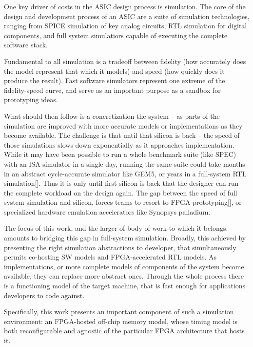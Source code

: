 One key driver of costs in the ASIC design process is simulation. The core of
the design and development process of an ASIC are a suite of simulation
technologies, ranging from SPICE simulation of key analog circuits, RTL
simulation for digital components, and full system simulatiors capable of
executing the complete software stack.

Fundamental to all simulation is a tradeoff between fidelity (how accurately
does the model represent that which it models) and speed (how quickly does it
produce the result). Fast software simulators represent one extreme of the
fidelity-speed curve, and serve as an important purpose as a sandbox for
prototyping ideas.

What should then follow is a concretization the system -- as parts of the
simulation are improved with more accurate models or implementations as they
become available. The challenge is that until that silicon is back -- the speed
of those simulations slows down exponentially as it approaches implementation.
While it may have been possible to run a whole benchmark suite (like SPEC) with
an ISA simulator in a single day, running the same suite could take months in
an abstract cycle-accurate simulator like GEM5, or years in a full-system RTL
simulation[]. Thus it is only until first silicon is back that the designer can
run the complete workload on the design again. The gap between the speed of
full system simulation and silicon, forces teams to resort to FPGA
prototyping[], or specialized hardware emulation accelerators like Synopsys
palladium\cite{palladium}.

The focus of this work, and the larger of body of work to which it belongs.
amounts to bridging this gap in full-system simulation. Broadly, this achieved
by presenting the right simulation abstractions to developer, that
simultaneously permits co-hosting SW models and FPGA-accelerated RTL models. As
implementations, or more complete models of components of the system become
available, they can replace more abstract ones. Through the whole process there
is a functioning model of the target machine, that is fast enough for
applications developers to code against.

Specifically, this work presents an important component of such a simulation
environment: an FPGA-hosted off-chip memory model, whose timing model is both
reconfigurable and agnostic of the particular FPGA architecture that hosts it.




